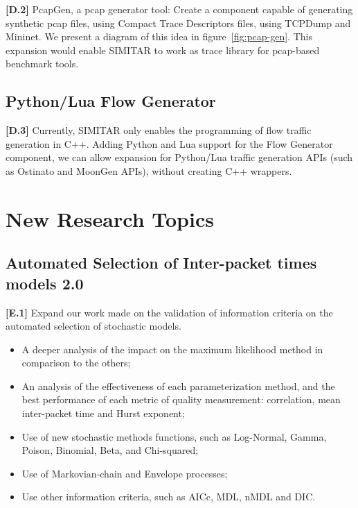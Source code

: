 \textbf{[D.2]} PcapGen, a pcap generator tool: Create a component capable of generating synthetic pcap files, using Compact Trace Descriptors files, using TCPDump\cite{web-tcpdump} and Mininet\cite{web-mininet}.  We present a diagram of this idea in figure~\ref{fig:pcap-gen}. This expansion would enable SIMITAR to work as trace library for pcap-based benchmark tools.

\subsection{Python/Lua Flow Generator}

\textbf{[D.3]} Currently, SIMITAR only enables the programming of flow traffic generation in C++. Adding Python and Lua support for the Flow Generator component, we can allow expansion for Python/Lua traffic generation APIs (such as Ostinato and MoonGen APIs), without creating C++ wrappers. 


\section{New Research Topics}


\subsection{Automated Selection of Inter-packet times models 2.0}

\textbf{[E.1]} Expand our work made on the validation of information criteria on the automated selection of stochastic models. 
\begin{itemize}
\item A deeper analysis of the impact on the maximum likelihood method in comparison to the others;
\item An analysis of the effectiveness of each parameterization method, and the best performance of each metric of quality measurement: correlation,  mean inter-packet time and Hurst exponent; 
\item Use of new stochastic methods functions, such as Log-Normal, Gamma, Poison, Binomial, Beta, and Chi-squared;
\item Use of Markovian-chain and Envelope processes;
\item Use other information criteria, such as \acrshort{AICc}, \acrshort{MDL}, \acrshort{nMDL}\cite{information-criteria} and \acrshort{DIC}\cite{dic-paper}.
\end{itemize}

